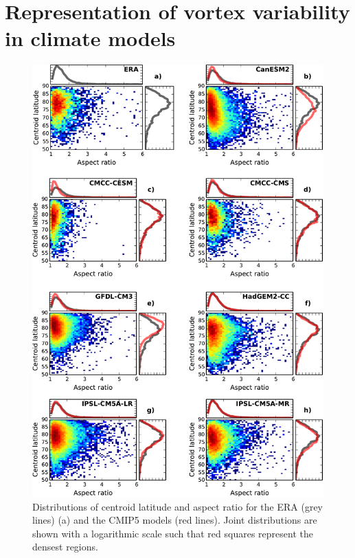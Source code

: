 \chapter{Representation of vortex variability in climate models}
\label{cha:models}


\begin{figure}
 \centering
 \noindent\includegraphics[width=\textwidth]{figures/chapter-models/moments_stats1.pdf}
 \caption[Distributions of moment diagnostics for the CMIP5
 models.]{Distributions of centroid latitude and aspect ratio for the ERA (grey
   lines) (a) and the CMIP5 models (red lines). Joint distributions are shown
   with a logarithmic scale such that red squares represent the densest
   regions.}
 \label{Fig2}
\end{figure}

